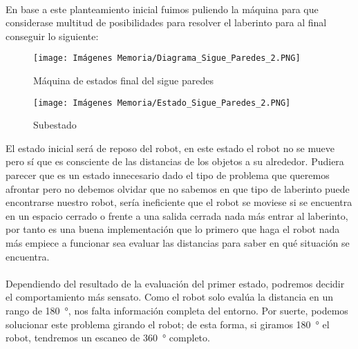 \documentclass[a4paper,9pt]{article}
\begin{document}
\paragraph{}

En base a este planteamiento inicial fuimos puliendo la máquina para que considerase multitud de posibilidades para resolver el laberinto para al final conseguir lo siguiente:

\begin{figure}[h!]
    \centering
    \begin{minipage}{0.45\textwidth}
        \centering
        \texttt{[image: Imágenes Memoria/Diagrama\_Sigue\_Paredes\_2.PNG]}
        \caption{Máquina de estados final del sigue paredes}
        \label{fig:Maquina de estados sigue-paredes}
    \end{minipage}%
    \hspace{0.05\textwidth} %
    \begin{minipage}{0.45\textwidth}
        \centering
        \texttt{[image: Imágenes Memoria/Estado\_Sigue\_Paredes\_2.PNG]}
        \caption{Subestado}
        \label{fig:Subestado}
    \end{minipage}
\end{figure}

El estado inicial será de reposo del robot, en este estado el robot no se mueve pero sí que es consciente de las distancias de los objetos a su alrededor. Pudiera parecer que es un estado innecesario dado el tipo de problema que queremos afrontar pero no debemos olvidar que no sabemos en que tipo de laberinto puede encontrarse nuestro robot, sería ineficiente que el robot se moviese si se encuentra en un espacio cerrado o frente a una salida cerrada nada más entrar al laberinto, por tanto es una buena implementación que lo primero que haga el robot nada más empiece a funcionar sea evaluar las distancias para saber en qué situación se encuentra.
\paragraph{}
Dependiendo del resultado de la evaluación del primer estado, podremos decidir el comportamiento más sensato. Como el robot solo evalúa la distancia en un rango de \SI{180}{\degree}, nos falta información completa del entorno. Por suerte, podemos solucionar este problema girando el robot; de esta forma, si giramos \SI{180}{\degree} el robot, tendremos un escaneo de \SI{360}{\degree} completo. 
\end{document}
